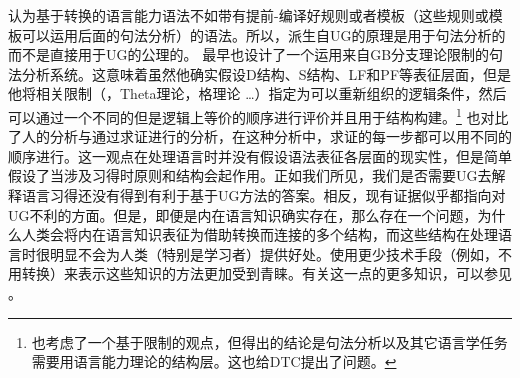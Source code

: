  \citet[]{FC96a-u}认为基于转换的语言能力语法不如带有提前-编译好规则或者模板（这些规则或模板可以运用后面的句法分析）的语法。所以，派生自UG的原理是用于句法分析的而不是直接用于UG的公理的。 \citet{Johnson89a}最早也设计了一个运用来自GB分支理论限制的句法分析系统。这意味着虽然他确实假设D结构、S结构、LF和PF等表征层面，但是他将相关限制（\xbartc，Theta理论，格理论 \ldots）指定为可以重新组织的逻辑条件，然后可以通过一个不同的但是逻辑上等价的顺序进行评价并且用于结构构建。\footnote{%
 \citet[\S~15.7]{Stabler92a-u}也考虑了一个基于限制的观点，但得出的结论是句法分析以及其它语言学任务需要用语言能力理论的结构层。这也给DTC提出了问题。
}
 \citet[]{Chomsky2007a}也对比了人的分析与通过求证进行的分析，在这种分析中，求证的每一步都可以用不同的顺序进行。这一观点在处理语言时并没有假设语法表征各层面的现实性，但是简单假设了当涉及习得时原则和结构会起作用。正如我们所见，我们是否需要UG去解释语言习得还没有得到有利于基于UG方法的答案。相反，现有证据似乎都指向对UG不利的方面。但是，即便是内在语言知识确实存在，那么存在一个问题，为什么人类会将内在语言知识表征为借助转换而连接的多个结构，而这些结构在处理语言时很明显不会为人类（特别是学习者）提供好处。使用更少技术手段（例如，不用转换）来表示这些知识的方法更加受到青睐。有关这一点的更多知识，可以参见 。
